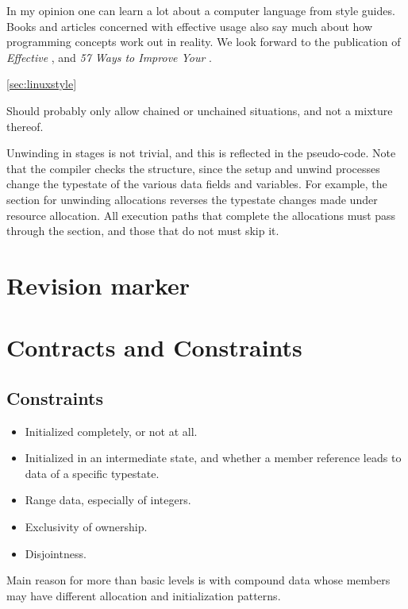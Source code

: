 \documentclass[10pt]{amsart}
\begin{document}
In my opinion one can learn a lot about a computer language from style
guides.  Books and articles concerned with effective usage also say
much about how programming concepts work out in reality.  We look
forward to the publication of \emph{Effective \Utop}, and \emph{57
  Ways to Improve Your \Utop}.

\ref{sec:linuxstyle}

Should probably only allow chained or unchained situations, and not a
mixture thereof.

Unwinding in stages is not trivial, and this is reflected in the
pseudo-code.  Note that the \Utop compiler checks the structure, since
the setup and unwind processes change the typestate of the various
data fields and variables.  For example, the section for unwinding
allocations reverses the typestate changes made under resource
allocation.  All execution paths that complete the allocations must
pass through the section, and those that do not must skip it.


\section{Revision marker}


\section{Contracts and Constraints}

\subsection{Constraints}



\begin{itemize}
\item Initialized completely, or not at all.
\item Initialized in an intermediate state, and whether a member
  reference leads to data of a specific typestate.
\item Range data, especially of integers.
\item Exclusivity of ownership.
\item Disjointness.
\end{itemize}

Main reason for more than basic levels is with compound data whose
members may have different allocation and initialization patterns.
\end{document}

